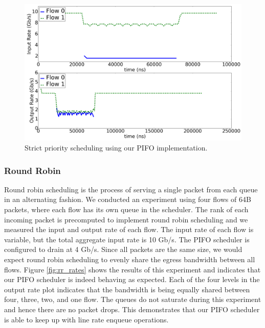 \begin{figure}[!h]
\includegraphics[width=1\linewidth]{figures/eval/strict_rates}
\caption{Strict priority scheduling using our PIFO implementation.}
\label{fig:strict_rates}
\end{figure}

\subsubsection*{Round Robin}\label{sec:round-robin}

Round robin scheduling is the process of serving a single packet from each queue in an alternating fashion. We conducted an experiment using four flows of 64B packets, where each flow has its own queue in the scheduler. The rank of each incoming packet is precomputed to implement round robin scheduling and we measured the input and output rate of each flow. The input rate of each flow is variable, but the total aggregate input rate is 10 Gb/s. The PIFO scheduler is configured to drain at 4 Gb/s. Since all packets are the same size, we would expect round robin scheduling to evenly share the egress bandwidth between all flows. Figure \ref{fig:rr_rates} shows the results of this experiment and indicates that our PIFO scheduler is indeed behaving as expected. Each of the four levels in the output rate plot indicates that the bandwidth is being equally shared between four, three, two, and one flow. The queues do not saturate during this experiment and hence there are no packet drops. This demonstrates that our PIFO scheduler is able to keep up with line rate enqueue operations.

